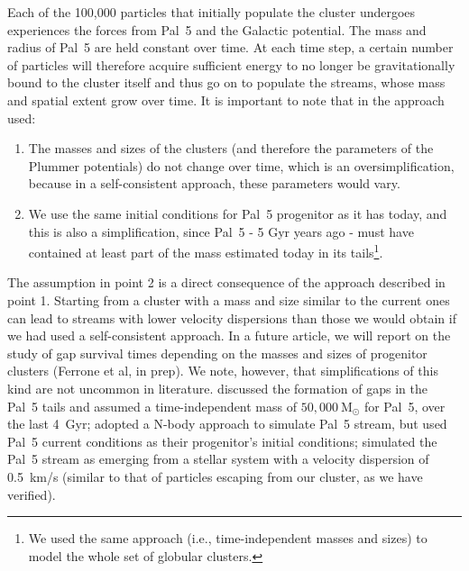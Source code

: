         Each of the 100,000 particles that initially populate the cluster undergoes experiences the forces from Pal~5 and the Galactic potential. The mass and radius of Pal~5 are held constant over time. At each time step, a certain number of particles will therefore acquire sufficient energy to no longer be gravitationally bound to the cluster itself and thus go on to populate the streams, whose mass and spatial extent grow over time. It is important to note that in the approach used:

        \begin{enumerate}
            \item The masses and sizes of the clusters (and therefore the parameters of the Plummer potentials) do not change over time, which is an oversimplification, because in a self-consistent approach, these parameters would vary. 
            \item We use the same initial conditions for Pal~5 progenitor as it has today, and this is also a simplification, since Pal~5 - 5 Gyr years ago - must have contained at least part of the mass estimated today in its tails\footnote{We used the same approach (i.e., time-independent masses and sizes) to model the whole set of globular clusters.}. 
        \end{enumerate}

        The assumption in point 2 is a direct consequence of the approach described in point 1. Starting from a cluster with a mass and size similar to the current ones can lead to streams with lower velocity dispersions than those we would obtain if we had used a self-consistent approach. In a future article, we will report on the study of gap survival times depending on the masses and sizes of progenitor clusters (Ferrone et al, in prep). We note, however, that simplifications of this kind are not uncommon in literature. \citet{2017NatAs...1..633P} discussed the formation of gaps in the Pal~5 tails and assumed a time-independent mass of $50,000 ~\mathrm{M}_\odot$ for Pal~5, over the last 4~Gyr; \citet{2017MNRAS.470...60E} adopted a N-body approach to simulate Pal~5 stream, but used Pal~5 current conditions as their progenitor's initial conditions; \citet{2019MNRAS.484.2009B} simulated the Pal~5 stream as emerging from a stellar system with a velocity dispersion of 0.5~km/s (similar to that of particles escaping from our cluster, as we have verified). 

